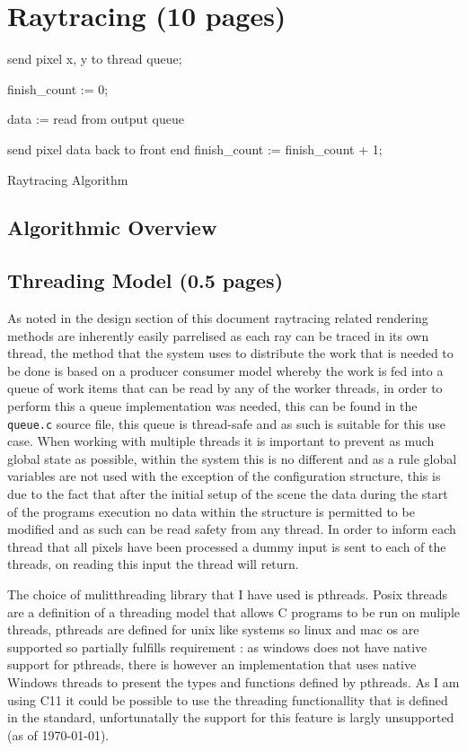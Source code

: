 \section{Raytracing (10 pages)}
\begin{algorithm}[H]
{
	send pixel x, y to thread queue;
}

finish\_count := 0;

{
	data := read from output queue

	{
		send pixel data back to front end
	}
	\Else
	{
		finish\_count := finish\_count + 1;
	}
}

\caption{Raytracing Algorithm}
\end{algorithm}

\subsection{Algorithmic Overview}

\subsection{Threading Model (0.5 pages)}
As noted in the design section of this document raytracing related rendering methods are inherently easily parrelised as each
ray can be traced in its own thread, the method that the system uses to distribute the work that is needed to be done is
based on a producer consumer model whereby the work is fed into a queue of work items that can be read by any of the worker
threads, in order to perform this a queue implementation was needed, this can be found in the \texttt{queue.c} source file,
this queue is thread-safe and as such is suitable for this use case. When working with multiple threads it is important
to prevent as much global state as possible, within the system this is no different and as a rule global variables are not used
with the exception of the configuration structure, this is due to the fact that after the initial setup of the scene the data
during the start of the programs execution no data within the structure is permitted to be modified and as such can be read
safety from any thread. In order to inform each thread that all pixels have been processed a dummy input is sent to each of the
threads, on reading this input the thread will return.


The choice of mulitthreading library that I have used is pthreads. Posix threads are a definition
of a threading model that allows C programs to be run on muliple threads, pthreads are defined for unix like systems so
linux and mac os are supported so partially fulfills requirement : as windows does not have native
support for pthreads, there is however an implementation that uses native Windows threads to present the types and functions defined
by pthreads. As I am using C11 it could be possible to use the threading functionallity that is defined in the standard,
unfortunatally the support for this feature is largly unsupported (as of \today).

